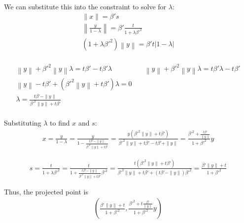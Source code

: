 \documentclass{article}
\theoremstyle{case}
\begin{document}
We can substitute this into the constraint to solve for $\lambda$:
\begin{align*}
\|x\| = {\beta'} s \\
\left\|\frac {y}{1 - \lambda}\right\| = {\beta'} \frac {t}{1 + \lambda {\beta'}^2 } \\
\left(1 + \lambda {\beta'}^2\right) \left\|y\right\| = {\beta'}  {t} \left|1 - \lambda\right|\\
\end{align*}

\begin{align*}
\left\|y\right\| + {\beta'}^2\left\|y\right\|\lambda = t {\beta'} - t {\beta'} \lambda          &   \quad
\left\|y\right\| + {\beta'}^2\left\|y\right\|\lambda = t {\beta'} \lambda - t {\beta'}					\\
\left\|y\right\|-t {\beta'} +\left( {\beta'}^2\left\|y\right\| + t {\beta'} \right)\lambda = 0  &		\\
\lambda = \frac{t {\beta'} - \|y\|}{{\beta'}^2\|y\| + t {\beta'}}                               &		\\
\end{align*}


Substituting $\lambda$ to find $x$ and $s$:
\begin{align*}
x = \frac {y}{1 - \lambda} 																		
= \frac {y}{1 - \frac{t{\beta'} - \|y\|}{{\beta'}^2\|y\| + t{\beta'}}} 									
= \frac {y\left({\beta'}^2\|y\| + t{\beta'}\right)}{{\beta'}^2\|y\| + t{\beta'} - t{\beta'} + \|y\|} 			
= \frac {{\beta'}^2 + \frac{t{\beta'}}{\|y\|}}{1 + {\beta'}^2}y 											
\end{align*}

\begin{align*}
s = \frac {t}{1 + \lambda{\beta'}^2 } 
= \frac {t}{1 +\frac{t{\beta'} - \|y\|}{{\beta'}^2\|y\| + t{\beta'}}{\beta'}^2 } 
= \frac {t\left({\beta'}^2\|y\| + t{\beta'}\right)}{{\beta'}^2\|y\| + t{\beta'} + \left(t{\beta'} - \|y\|\right){\beta'}^2 } 
= \frac {{\beta'}\|y\| + t}{1 + {\beta'}^2 } 
\end{align*}


Thus, the projected point is
\begin{align*}
\left(\frac{{\beta'} \|y\| + t}{1 + {\beta'} ^ 2}, \frac{{\beta'} ^ 2 + t \frac {{\beta'}}{\|y\|}}{1 + {\beta'} ^ 2}y\right)
\end{align*}
\end{document}

